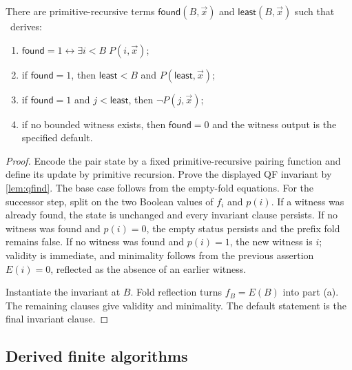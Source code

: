 \begin{theorem}\label{thm:least-search}
There are primitive-recursive terms \(\mathsf{found}(B,\vec x)\) and \(\mathsf{least}(B,\vec x)\) such that \iPRA\ derives:
\begin{enumerate}[label=(\alph*)]
  \item \(\mathsf{found}=1\leftrightarrow\exists i<B\;P(i,\vec x)\);
  \item if \(\mathsf{found}=1\), then \(\mathsf{least}<B\) and \(P(\mathsf{least},\vec x)\);
  \item if \(\mathsf{found}=1\) and \(j<\mathsf{least}\), then \(\neg P(j,\vec x)\);
  \item if no bounded witness exists, then \(\mathsf{found}=0\) and the witness output is the specified default.
\end{enumerate}
\end{theorem}

\begin{proof}
Encode the pair state by a fixed primitive-recursive pairing function and define its update by primitive recursion.  Prove the displayed QF invariant by \cref{lem:qfind}.  The base case follows from the empty-fold equations.  For the successor step, split on the two Boolean values of \(f_i\) and \(p(i)\).  If a witness was already found, the state is unchanged and every invariant clause persists.  If no witness was found and \(p(i)=0\), the empty status persists and the prefix fold remains false.  If no witness was found and \(p(i)=1\), the new witness is \(i\); validity is immediate, and minimality follows from the previous assertion \(E(i)=0\), reflected as the absence of an earlier witness.

Instantiate the invariant at \(B\).  Fold reflection turns \(f_B=E(B)\) into part (a).  The remaining clauses give validity and minimality.  The default statement is the final invariant clause.
\end{proof}

\subsection{Derived finite algorithms}

